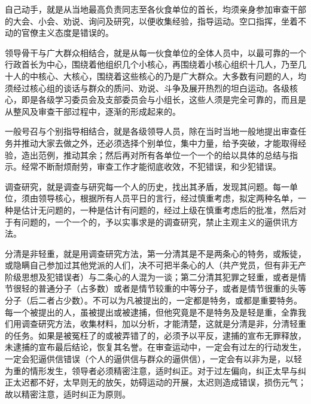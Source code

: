 自己动手，就是从当地最高负责同志至各伙食单位的首长，均须亲身参加审查干部的大会、小会、劝说、询问及研究，以便收集经验，指导运动。空口指挥，坐着不动的官僚主义态度是错误的。

领导骨干与广大群众相结合，就是从每一伙食单位的全体人员中，以最可靠的一个行政首长为中心，围绕着他组织几个小核心，再围绕着小核心组织十几人，乃至几十人的中核心、大核心，围绕着这些核心的乃是广大群众。大多数有问题的人，均须经过核心组的谈话与群众的质问、劝说、斗争及展开热烈的坦白运动。各级核心，即是各级学习委员会及支部委员会与小组长，这些人须是完全可靠的，而且是从整风及审查干部过程中，逐渐的形成起来的。

一般号召与个别指导相结合，就是各级领导人员，除在当时当地一般地提出审查任务并推动大家去做之外，还必须选择个别单位，集中力量，给予突破，才能取得经验，造出范例，推动其余；然后再对所有各单位一个一个的给以具体的总结与指示。经常不断耐烦耐劳，审查工作才能彻底收效，不犯错误，和少犯错误。

调查研究，就是调查与研究每一个人的历史，找出其矛盾，发现其问题。每一单位，须由领导核心，根据所有人员平日的言行，经过慎重考虑，拟定两种名单，一种是估计无问题的，一种是估计有问题的，经过上级在慎重考虑后的批准，然后对于有问题的，一个一个的，予以实事求是的调查研究，禁止主观主义的逼供讯方法。

分清是非轻重，就是用调查研究方法，第一分清其是不是两条心的特务，或叛徒，或隐瞒自己参加过其他党派的人们，决不可把半条心的人（共产党员，但有非无产阶级思想及犯错误者）与二条心的人混为一谈；第二分清其犯罪之轻重，或者是情节很轻的普通分子（占多数）或者是情节较重的中等分子，或者是情节很重的头等分子（后二者占少数）。不可以为凡被提出的，一定都是特务，或都是重要特务。每一个被提出的人，虽被提出或被逮捕，但他究竟是不是特务及是轻是重，全靠我们用调查研究方法，收集材料，加以分析，才能清楚，这就是分清是非，分清轻重的任务。如果是被冤枉了的或被弄错了的，必须予以平反，逮捕的宣布无罪释放，未逮捕的宣布最后结论，恢复其名誉。在审查运动中，一定会有过左的行动发生，一定会犯逼供信错误（个人的逼供信与群众的逼供信），一定会有以非为是，以轻为重的情形发生，领导者必须精密注意，适时纠正。对于过左偏向，纠正太早与纠正太迟都不好，太早则无的放矢，妨碍运动的开展，太迟则造成错误，损伤元气；故以精密注意，适时纠正为原则。

